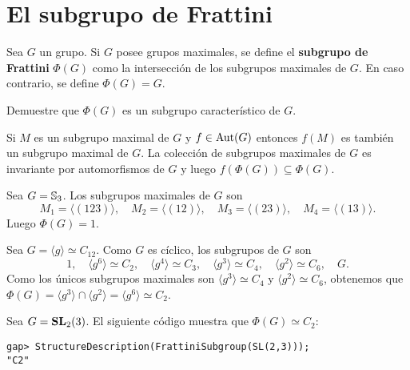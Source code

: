 \chapter{El subgrupo de Frattini}

\begin{definition}
	Sea $G$ un grupo. Si $G$ posee grupos maximales, se define el
	\textbf{subgrupo de Frattini} $\Phi(G)$ como la intersección de los
	subgrupos maximales de $G$. En caso contrario, se define $\Phi(G)=G$.
\end{definition}

\begin{exercise}
	Demuestre que $\Phi(G)$ es un subgrupo característico de $G$.
\end{exercise}

\begin{svgraybox}
	Si $M$ es un subgrupo maximal de $G$ y $f\in\operatorname{Aut}(G)$ entonces $f(M)$ es
	también un subgrupo maximal de $G$. La colección de subgrupos maximales de
	$G$ es invariante por automorfismos de $G$ y luego $f(\Phi(G))\subseteq
	\Phi(G)$.
\end{svgraybox}

\begin{example}
	Sea $G=\mathbb{S}_3$.  Los subgrupos maximales de $G$ son 
	\[
	M_1=\langle (123)\rangle,
	\quad
	M_2=\langle (12)\rangle,
	\quad
	M_3=\langle (23)\rangle,
	\quad
	M_4=\langle (13)\rangle.
	\]
	Luego
	$\Phi(G)=1$. 
\end{example}

\begin{example}
	Sea $G=\langle g\rangle\simeq C_{12}$. Como $G$ es cíclico, los subgrupos de $G$ son 
	\[
	1,\quad
	\langle g^6\rangle\simeq C_2,\quad
	\langle g^4\rangle\simeq C_3,\quad
	\langle g^3\rangle\simeq C_4,\quad
	\langle g^2\rangle\simeq C_6,\quad
	G.
	\]
	Como los únicos subgrupos maximales son $\langle g^3\rangle\simeq C_4$ y $\langle
	g^2\rangle\simeq C_6$, obtenemos que $\Phi(G)=\langle g^3\rangle\cap \langle
	g^2\rangle=\langle g^6\rangle\simeq C_2$.
\end{example}

\begin{example}
	Sea $G=\mathbf{SL}_2(3)$. El siguiente código muestra que $\Phi(G)\simeq C_2$: 
\begin{lstlisting}
gap> StructureDescription(FrattiniSubgroup(SL(2,3)));
"C2"
\end{lstlisting}
\end{example}

